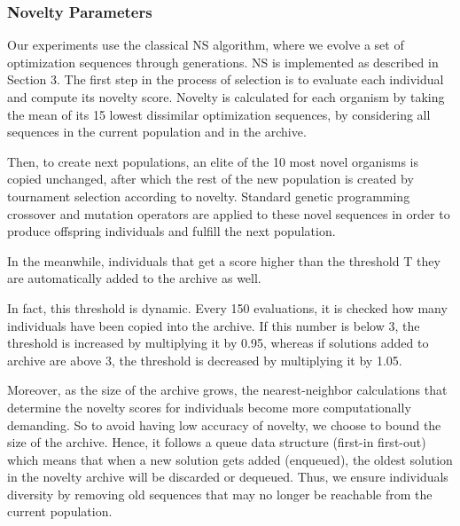 \subsubsection{Novelty Parameters}
Our experiments use the classical NS algorithm, where we evolve a set of optimization sequences through generations.
NS is implemented as described in Section 3.
The first step in the process of selection is to evaluate each individual and compute its novelty score. Novelty is calculated for each organism by taking the mean of its 15 lowest dissimilar optimization sequences, by considering all sequences in the current population and in the archive. 

Then, to create next populations, an elite of the 10 most novel organisms is copied unchanged, after which the rest of the new population is created by tournament selection according to novelty. Standard genetic programming crossover and mutation operators are applied to these novel sequences in order to produce offspring individuals and fulfill the next population.

In the meanwhile, individuals that get a score higher than the threshold T they are automatically added to the archive as well. 

In fact, this threshold is dynamic. Every 150 evaluations, it is checked how many individuals have been copied into the archive. If this number is below 3, the threshold is increased by multiplying it by 0.95, whereas if solutions added to archive are above 3, the threshold is decreased by multiplying it by 1.05. 

Moreover, as the size of the archive grows, the nearest-neighbor calculations that determine the novelty scores for individuals become more computationally demanding. So to avoid having low accuracy of novelty, we choose to bound the size of the archive. Hence, it follows a queue data structure (first-in first-out) which means that when a new solution gets added (enqueued), the oldest solution in the novelty archive will be discarded or dequeued. Thus, we ensure individuals diversity by removing old sequences that may no longer be reachable from the current population.

